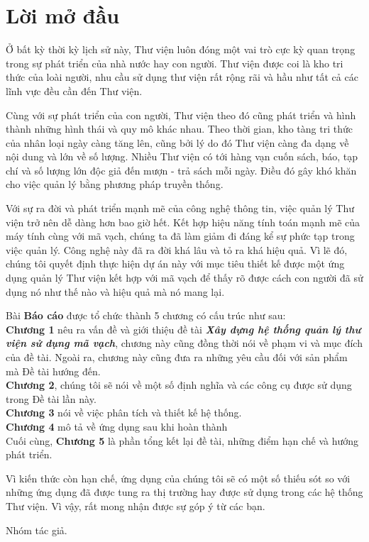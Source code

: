 \documentclass[12pt]{report}
\begin{document}
	\chapter*{Lời mở đầu}	
	\label{chpt:abstraction}	
		\par Ở bất kỳ thời kỳ lịch sử này, Thư viện luôn đóng một vai trò cực kỳ quan trọng trong sự phát triển của nhà nước hay con người. Thư viện được coi là kho tri thức của loài người, nhu cầu sử dụng thư viện rất rộng rãi và hầu như tất cả các lĩnh vực đều cần đến Thư viện.
		\par Cùng với sự phát triển của con người, Thư viện theo đó cũng phát triển và hình thành những hình thái và quy mô khác nhau. Theo thời gian, kho tàng tri thức của nhân loại ngày càng tăng lên, cũng bởi lý do đó Thư viện càng đa dạng về nội dung và lớn về số lượng. Nhiều Thư viện có tới hàng vạn cuốn sách, báo, tạp chí và số lượng lớn độc giả đến mượn - trả sách mỗi ngày. Điều đó gây khó khăn cho việc quản lý bằng phương pháp truyền thống.
		\par Với sự ra đời và phát triển mạnh mẽ của công nghệ thông tin, việc quản lý Thư viện trở nên dễ dàng hơn bao giờ hết. Kết hợp hiệu năng tính toán mạnh mẽ của máy tính cùng với mã vạch, chúng ta đã làm giảm đi đáng kể sự phức tạp trong việc quản lý. Công nghệ này đã ra đời khá lâu và tỏ ra khá hiệu quả. Vì lẽ đó, chúng tôi quyết định thực hiện dự án này với mục tiêu thiết kế được một ứng dụng quản lý Thư viện kết hợp với mã vạch để thấy rõ được cách con người đã sử dụng nó như thế nào và hiệu quả mà nó mang lại.
		\par Bài \textbf{Báo cáo} được tổ chức thành 5 chương có cấu trúc như sau:\\
		\textbf{Chương 1} nêu ra vấn đề và giới thiệu đề tài \textbf{\textit{Xây dựng hệ thống quản lý thư viện sử dụng mã vạch}}, chương này cũng đồng thời nói về phạm vi và mục đích của đề tài. Ngoài ra, chương này cũng đưa ra những yêu cầu đối với sản phẩm mà Đề tài hướng đến.\\
		\textbf{Chương 2}, chúng tôi sẽ nói về một số định nghĩa và các công cụ được sử dụng trong Đề tài lần này. \\
		\textbf{Chương 3} nói về việc phân tích và thiết kế hệ thống. \\
		\textbf{Chương 4} mô tả về ứng dụng sau khi hoàn thành\\
		Cuối cùng, \textbf{Chương 5} là phần tổng kết lại đề tài, những điểm hạn chế và hướng phát triển.
		\par Vì kiến thức còn hạn chế, ứng dụng của chúng tôi sẽ có một số thiếu sót so với những ứng dụng đã được tung ra thị trường hay được sử dụng trong các hệ thống Thư viện. Vì vậy, rất mong nhận được sự góp ý từ các bạn. 
		\begin{flushright}
			Nhóm tác giả.
		\end{flushright}
\end{document}
